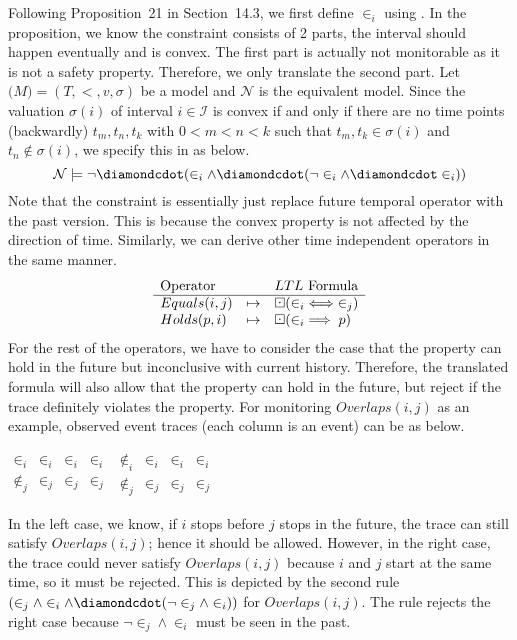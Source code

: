\documentclass{article}
\begin{document}
\begin{enumerate}
Following Proposition~21 in Section~14.3,
we first define $\in_i$ using \ptLTL.
In the proposition, we know the constraint consists of 2 parts,
the interval should happen eventually and is convex.
The first part is actually not monitorable as it is not a safety property.
Therefore, we only translate the second part.
Let $\mathcal(M) = (T, <, v, \sigma)$ be a \ALTL model and $\mathcal{N}$ is
the equivalent \ptLTL model.
Since the valuation $\sigma(i)$ of interval $i \in \mathcal{I}$ is convex
if and only if there are no time points (backwardly) $t_m, t_n, t_k$ with $0 < m < n < k$
such that $t_m, t_k \in \sigma(i)$ and $t_n \notin \sigma(i)$,
we specify this in \ptLTL as below.
$$
	\mathcal{N} \models \neg \PastF (\in_i \land \PastF( \neg \in_i \land \PastF \in_i))
$$
Note that the constraint is essentially just replace future temporal operator with the past version.
This is because the convex property is not affected by the direction of time.
Similarly, we can derive other time independent \ALTL operators in the same manner.
$$
\begin{array}{lcl}
	\text{Operator} &         & LTL \text{ Formula}       \\ \hline
	Equals(i, j)    & \mapsto & \boxdot (\in_i \iff \in_j) \\
	Holds(p, i)     & \mapsto & \boxdot (\in_i \implies p) \\
\end{array}
$$
For the rest of the operators, we have to consider the case that the property can
hold in the future but inconclusive with current history.
Therefore, the translated \ptLTL formula will also allow that the property can hold in the future, but reject if the trace definitely violates the property.
For monitoring $Overlaps(i,j)$ as an example, observed event traces (each column is an event) can be as below.

\begin{center}
$
\begin{array}{*{4}{c}|}
	  \in_i    & \in_i & \in_i & \in_i \\
	\not \in_j & \in_j & \in_j & \in_j
\end{array}
$\hspace{3cm}
$
\begin{array}{*{4}{c}|}
	\not\in_i & \in_i & \in_i & \in_i \\
	\not\in_j & \in_j & \in_j & \in_j
\end{array}
$
\end{center}

In the left case, we know, if $i$ stops before $j$ stops in the future,
the trace can still satisfy $Overlaps(i,j)$; hence it should be allowed.
However, in the right case, the trace could never satisfy $Overlaps(i,j)$ because $i$ and $j$ start at the same time,
so it must be rejected.
This is depicted by the second rule $(\in_j\land\in_i\land\PastF(\neg\in_j\land\in_i))$ for $Overlaps(i,j)$.
The rule rejects the right case because $\neg\in_j\land\in_i$ must be seen in the past.


\end{enumerate}
\end{document}

